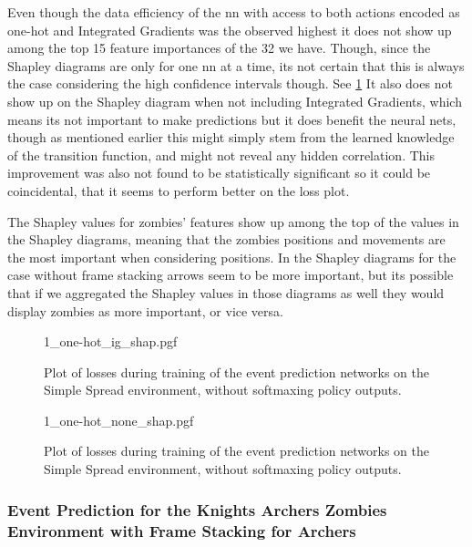 \documentclass[UKenglish]{uiomasterthesis}
\begin{document}
Even though the data efficiency of the \ac{nn} with access to both actions encoded as one-hot and Integrated Gradients was the observed highest it does not show up among the top 15 feature importances of the 32 we have. Though, since the Shapley diagrams are only for one \ac{nn} at a time, its not certain that this is always the case considering the high confidence intervals though. See \cref{fig:state_kaz_archer_stack_ig} It also does not show up on the Shapley diagram when not including Integrated Gradients, which means its not important to make predictions but it does benefit the neural nets, though as mentioned earlier this might simply stem from the learned knowledge of the transition function, and might not reveal any hidden correlation. This improvement was also not found to be statistically significant so it could be coincidental, that it seems to perform better on the loss plot.

The Shapley values for zombies' features show up among the top of the values in the Shapley diagrams, meaning that the zombies positions and movements are the most important when considering positions. In the Shapley diagrams for the case without frame stacking arrows seem to be more important, but its possible that if we aggregated the Shapley values in those diagrams as well they would display zombies as more important, or vice versa.

\begin{figure}[H]
    \centering
    {1_one-hot_ig_shap.pgf}
    \caption{Plot of losses during training of the event prediction networks on the Simple Spread environment, without softmaxing policy outputs.}
    \label{fig:state_kaz_archer_stack_ig}
\end{figure}

\begin{figure}[H]
    \centering
    {1_one-hot_none_shap.pgf}
    \caption{Plot of losses during training of the event prediction networks on the Simple Spread environment, without softmaxing policy outputs.}
    \label{fig:state_kaz_archer_stack}
\end{figure}


\subsubsection{Event Prediction for the Knights Archers Zombies Environment with Frame Stacking for Archers}
\end{document}
